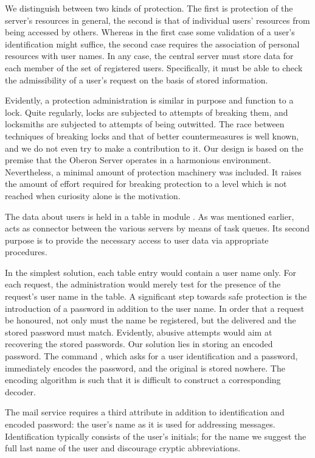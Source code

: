 We distinguish between two kinds of protection. The first is protection of the server's resources in general, the second is that of individual users' resources from being accessed by others. Whereas in the first case some validation of a user's identification might suffice, the second case requires the association of personal resources with user names. In any case, the central server must store data for each member of the set of registered users. Specifically, it must be able to check the admissibility of a user's request on the basis of stored information.

Evidently, a protection administration is similar in purpose and function to a lock. Quite regularly, locks are subjected to attempts of breaking them, and locksmiths are subjected to attempts of being outwitted. The race between techniques of breaking locks and that of better countermeasures is well known, and we do not even try to make a contribution to it. Our design is based on the premise that the Oberon Server operates in a harmonious environment. Nevertheless, a minimal amount of protection machinery was included. It raises the amount of effort required for breaking protection to a level which is not reached when curiosity alone is the motivation.

The data about users is held in a table in module . As was mentioned earlier,  acts as connector between the various servers by means of task queues. Its second purpose is to provide the necessary access to user data via appropriate procedures.

In the simplest solution, each table entry would contain a user name only. For each request, the administration would merely test for the presence of the request's user name in the table. A significant step towards safe protection is the introduction of a password in addition to the user name. In order that a request be honoured, not only must the name be registered, but the delivered and the stored password must match. Evidently, abusive attempts would aim at recovering the stored passwords. Our solution lies in storing an encoded password. The command , which asks for a user identification and a password, immediately encodes the password, and the original is stored nowhere. The encoding algorithm is such that it is difficult to construct a corresponding decoder.

The mail service requires a third attribute in addition to identification and encoded password: the user's name as it is used for addressing messages. Identification typically consists of the user's initials; for the name we suggest the full last name of the user and discourage cryptic abbreviations.


